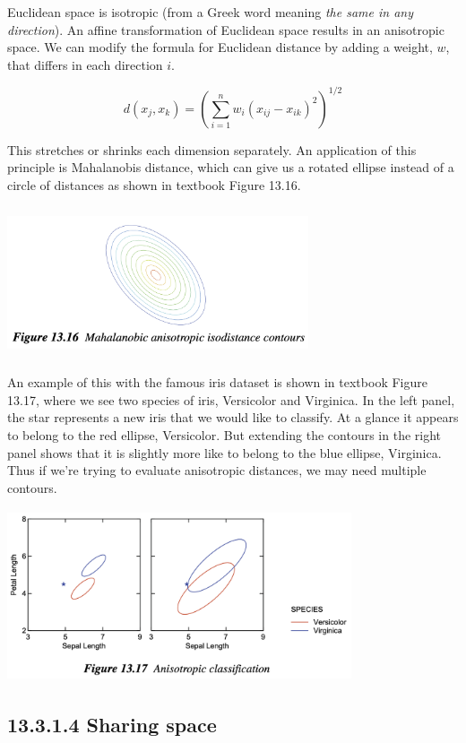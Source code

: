 Euclidean space is isotropic (from a Greek word meaning \emph{the same
in any direction}). An affine transformation of Euclidean space results
in an anisotropic space. We can modify the formula for Euclidean
distance by adding a weight, \(w\), that differs in each direction
\(i\).

\[
d(x_j,x_k)=\left(\sum_{i=1}^n w_i ( x_{ij}-x_{ik})^2\right)^{1/2}
\]

This stretches or shrinks each dimension separately. An application of
this principle is Mahalanobis distance, which can give us a rotated
ellipse instead of a circle of distances as shown in textbook Figure
13.16.

\includegraphics[width=3.5in,height=1.75in]{fiMahalanobis.png}

An example of this with the famous iris dataset is shown in textbook
Figure 13.17, where we see two species of iris, Versicolor and
Virginica. In the left panel, the star represents a new iris that we
would like to classify. At a glance it appears to belong to the red
ellipse, Versicolor. But extending the contours in the right panel shows
that it is slightly more like to belong to the blue ellipse, Virginica.
Thus if we're trying to evaluate anisotropic distances, we may need
multiple contours.

\includegraphics[width=4in,height=2in]{fiIris.png}

\hypertarget{sharing-space}{%
\subsection{13.3.1.4 Sharing space}\label{sharing-space}}

